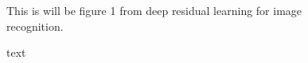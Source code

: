 \begin{figure}
	This is will be figure 1 from deep residual learning for image recognition.
	\caption{text}
	\label{fig:depth-performance-decline}
\end{figure}